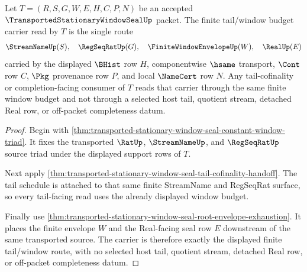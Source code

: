 \begin{theorem}
\label{thm:transported-stationary-window-seal-tail-budget-carrier}
Let $T=(R,S,G,W,E,H,C,P,N)$ be an accepted $\TransportedStationaryWindowSealUp$ packet. The finite tail/window budget carrier read by $T$ is the single route
$$
\begin{aligned}
  \StreamNameUp(S),\quad
  \RegSeqRatUp(G),\quad
  \FiniteWindowEnvelopeUp(W),\quad
  \RealUp(E)
\end{aligned}
$$
carried by the displayed $\BHist$ row $H$, componentwise $\hsame$ transport, $\Cont$ row $C$, $\Pkg$ provenance row $P$, and local $\NameCert$ row $N$. Any tail-cofinality or completion-facing consumer of $T$ reads that carrier through the same finite window budget and not through a selected host tail, quotient stream, detached Real row, or off-packet completeness datum.
\end{theorem}
\begin{proof}
Begin with \autoref{thm:transported-stationary-window-seal-constant-window-triad}. It fixes the transported $\RatUp$, $\StreamNameUp$, and $\RegSeqRatUp$ source triad under the displayed support rows of $T$.

Next apply \autoref{thm:transported-stationary-window-seal-tail-cofinality-handoff}. The tail schedule is attached to that same finite StreamName and RegSeqRat surface, so every tail-facing read uses the already displayed window budget.

Finally use \autoref{thm:transported-stationary-window-seal-root-envelope-exhaustion}. It places the finite envelope $W$ and the Real-facing seal row $E$ downstream of the same transported source. The carrier is therefore exactly the displayed finite tail/window route, with no selected host tail, quotient stream, detached Real row, or off-packet completeness datum.
\end{proof}


